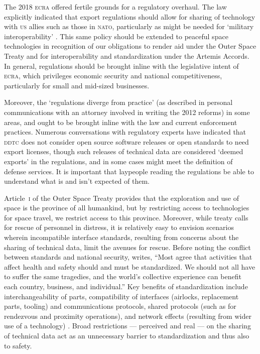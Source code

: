 \documentclass[preprint,twocolumn,5p]{elsarticle}
\begin{document}
The 2018 \textsc{ecra} offered fertile grounds for a regulatory overhaul. The law explicitly indicated that export regulations should allow for sharing of technology with \textsc{us} allies such as those in \textsc{nato}, particularly as might be needed for `military interoperability' \citep{ECRA2018}. This same policy should be extended to peaceful space technologies in recognition of our obligations to render aid under the Outer Space Treaty and for interoperability and standardization under the Artemis Accords. In general, regulations should be brought inline with the legislative intent of \textsc{ecra}, which privileges economic security and national competitiveness, particularly for small and mid-sized businesses.

Moreover, the `regulations diverge from practice' (as described in personal communications with an attorney involved in writing the 2012 reforms) in some areas, and ought to be brought inline with the law and current enforcement practices. Numerous conversations with regulatory experts have indicated that \textsc{ddtc} does not consider open source software releases or open standards to need export licenses, though such releases of technical data are considered `deemed exports' in the regulations, and in some cases might meet the definition of defense services. It is important that laypeople reading the regulations be able to understand what is and isn't expected of them.

Article~\textsc{i} of the Outer Space Treaty provides that the exploration and use of space is the province of all humankind, but by restricting access to technologies for space travel, we restrict access to this province. Moreover, while treaty calls for rescue of personnel in distress, it is relatively easy to envision scenarios wherein incompatible interface standards, resulting from concerns about the sharing of technical data, limit the avenues for rescue. Before noting the conflict between standards and national security, \citet{Finkleman2005} writes, ``Most agree that activities that affect health and safety should and must be standardized. We should not all have to suffer the same tragedies, and the world's collective experience can benefit each country, business, and individual.'' Key benefits of standardization include interchangeability of parts, compatibility of interfaces (airlocks, replacement parts, tooling) and communications protocols, shared protocols (such as for rendezvous and proximity operations), and network effects (resulting from wider use of a technology) \citep[see also][]{Swann2000,Finkleman2006,Ping2011}. Broad restrictions --- perceived and real --- on the sharing of technical data act as an unnecessary barrier to standardization and thus also to safety.
\end{document}
